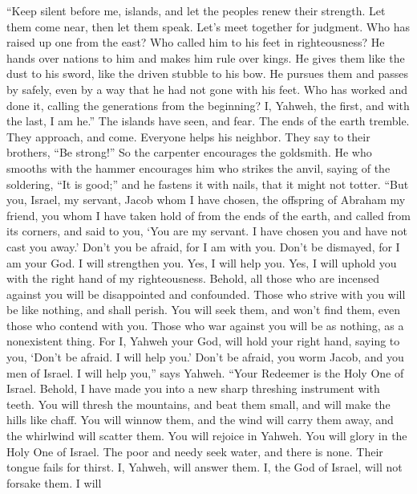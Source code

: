  ``Keep silent before me, islands, and let the peoples renew
their strength. Let them come near, then let them speak. Let's meet
together for judgment.  Who has raised up one from the east?
Who called him to his feet in righteousness? He hands over nations to
him and makes him rule over kings. He gives them like the dust to his
sword, like the driven stubble to his bow.  He pursues them
and passes by safely, even by a way that he had not gone with his feet.
 Who has worked and done it, calling the generations from
the beginning? I, Yahweh, the first, and with the last, I am he.''
 The islands have seen, and fear. The ends of the earth
tremble. They approach, and come.  Everyone helps his
neighbor. They say to their brothers, ``Be strong!''  So the
carpenter encourages the goldsmith. He who smooths with the hammer
encourages him who strikes the anvil, saying of the soldering, ``It is
good;'' and he fastens it with nails, that it might not totter.
 ``But you, Israel, my servant, Jacob whom I have chosen,
the offspring of Abraham my friend,  you whom I have taken
hold of from the ends of the earth, and called from its corners, and
said to you, `You are my servant. I have chosen you and have not cast
you away.'  Don't you be afraid, for I am with you. Don't
be dismayed, for I am your God. I will strengthen you. Yes, I will help
you. Yes, I will uphold you with the right hand of my righteousness.
 Behold, all those who are incensed against you will be
disappointed and confounded. Those who strive with you will be like
nothing, and shall perish.  You will seek them, and won't
find them, even those who contend with you. Those who war against you
will be as nothing, as a nonexistent thing.  For I, Yahweh
your God, will hold your right hand, saying to you, `Don't be afraid. I
will help you.'  Don't be afraid, you worm Jacob, and you
men of Israel. I will help you,'' says Yahweh. ``Your Redeemer is the
Holy One of Israel.  Behold, I have made you into a new
sharp threshing instrument with teeth. You will thresh the mountains,
and beat them small, and will make the hills like chaff. 
You will winnow them, and the wind will carry them away, and the
whirlwind will scatter them. You will rejoice in Yahweh. You will glory
in the Holy One of Israel.  The poor and needy seek water,
and there is none. Their tongue fails for thirst. I, Yahweh, will answer
them. I, the God of Israel, will not forsake them.  I will
